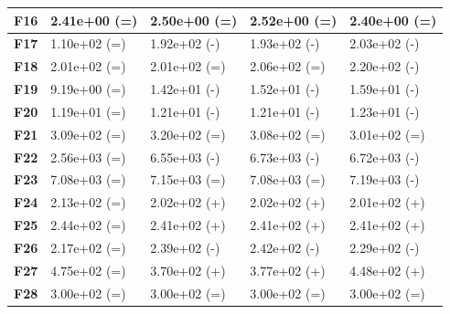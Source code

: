 \documentclass[12pt,a4paper]{report}
\begin{document}
{{{{{{{\begin{table}[h]
\begin{tabular}{|l|l|l|l|l|}
{\bf F16} & 2.41e+00 (=)        & 2.50e+00 (=)    & 2.52e+00 (=)     & 2.40e+00 (=)     \\ \hline
{\bf F17} & 1.10e+02 (=)        & 1.92e+02 (-)    & 1.93e+02 (-)     & 2.03e+02 (-)     \\ \hline
{\bf F18} & 2.01e+02 (=)        & 2.01e+02 (=)    & 2.06e+02 (=)     & 2.20e+02 (-)     \\ \hline
{\bf F19} & 9.19e+00 (=)        & 1.42e+01 (-)    & 1.52e+01 (-)     & 1.59e+01 (-)     \\ \hline
{\bf F20} & 1.19e+01 (=)        & 1.21e+01 (-)    & 1.21e+01 (-)     & 1.23e+01 (-)     \\ \hline
{\bf F21} & 3.09e+02 (=)        & 3.20e+02 (=)    & 3.08e+02 (=)     & 3.01e+02 (=)     \\ \hline
{\bf F22} & 2.56e+03 (=)        & 6.55e+03 (-)    & 6.73e+03 (-)     & 6.72e+03 (-)     \\ \hline
{\bf F23} & 7.08e+03 (=)        & 7.15e+03 (=)    & 7.08e+03 (=)     & 7.19e+03 (-)     \\ \hline
{\bf F24} & 2.13e+02 (=)        & 2.02e+02 (+)    & 2.02e+02 (+)     & 2.01e+02 (+)     \\ \hline
{\bf F25} & 2.44e+02 (=)        & 2.41e+02 (+)    & 2.41e+02 (+)     & 2.41e+02 (+)     \\ \hline
{\bf F26} & 2.17e+02 (=)        & 2.39e+02 (-)    & 2.42e+02 (-)     & 2.29e+02 (-)     \\ \hline
{\bf F27} & 4.75e+02 (=)        & 3.70e+02 (+)    & 3.77e+02 (+)     & 4.48e+02 (+)     \\ \hline
{\bf F28} & 3.00e+02 (=)        & 3.00e+02 (=)    & 3.00e+02 (=)     & 3.00e+02 (=)     \\ \hline
\end{tabular}
\end{table}

}}}}}}}
\end{document}
